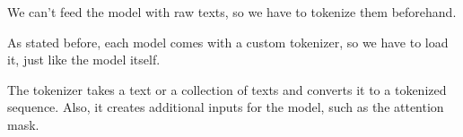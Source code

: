 \documentclass[letterpaper,10pt,english]{jupyterBook}
\begin{document}
\sphinxAtStartPar
We can’t feed the model with raw texts, so we have to tokenize them beforehand.

\sphinxAtStartPar
As stated before, each model comes with a custom tokenizer, so we have to load it, just like the model itself.
\begin{sphinxVerbatimInput}

\begin{sphinxVerbatim}[commandchars=\\\{\}]
   

   
  
\end{sphinxVerbatim}
\end{sphinxVerbatimInput}

\sphinxAtStartPar
The tokenizer takes a text or a collection of texts and converts it to a tokenized sequence. Also, it creates additional inputs for the model, such as the attention mask.
\end{document}
